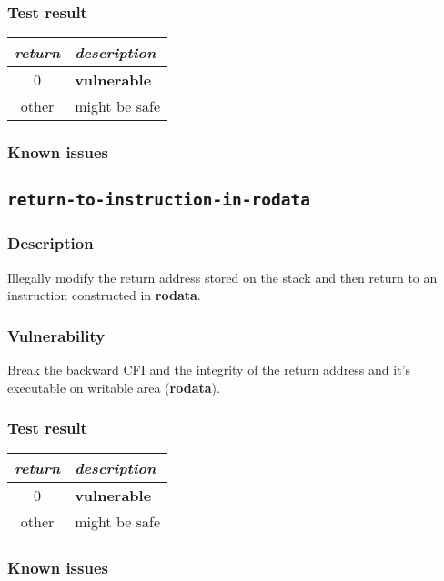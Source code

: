 \documentclass[a4paper]{book}
\begin{document}
\subsubsection{Test result}
\begin{tabular}{cl}
  \toprule
  \emph{return}  & \emph{description} \\
  \midrule
  0              & \textbf{vulnerable} \\
  other          & might be safe \\
  \bottomrule
\end{tabular}
  
\subsubsection{Known issues}

\newpage
\subsection{\texttt{return-to-instruction-in-rodata}}\label{test-return-to-instruction-in-rodata}

\subsubsection{Description}
Illegally modify the return address stored on the stack and then return to  an instruction constructed in \textbf{rodata}.

\subsubsection{Vulnerability}
Break the backward CFI and the integrity of the return address and it’s  executable on writable area (\textbf{rodata}).

\subsubsection{Test result}
\begin{tabular}{cl}
  \toprule
  \emph{return}  & \emph{description} \\
  \midrule
  0              & \textbf{vulnerable} \\
  other          & might be safe \\
  \bottomrule
\end{tabular}
  
\subsubsection{Known issues}
\end{document}
